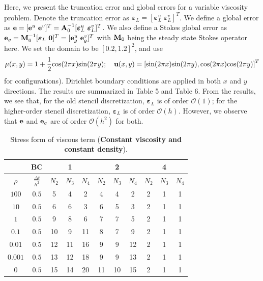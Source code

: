 \documentclass[9pt]{article}
\newcommand{\V}[1]{\boldsymbol{#1}}
\begin{document}
Here, we present the truncation error and global errors for a variable viscosity problem. Denote the truncation error as ${\V{\varepsilon}}_L=[{\V{\varepsilon}}_L^u ~{\V{\varepsilon}}_L^v]^T$. We define a global error as ${\bf e}=[{\bf e}^u ~{\bf e}^v]^T={\bf A}_0^{-1}[{\V{\varepsilon}}_L^u ~{\V{\varepsilon}}_L^v]^T$. We also define a Stokes global error as ${\bf e}_g={\bf M}_0^{-1}[{\V{\varepsilon}}_L ~{\bf 0}]^{T}=[{\bf e}_g^u ~{\bf e}_g^v]^T$ with ${\bf M}_0$ being the steady state Stokes operator here. We set the domain to be $[0.2, 1.2]^2$, and use
$$
\mu(x,y)=1+\frac{1}{2} \mbox{cos}(2 \pi x) \mbox{sin}(2 \pi y); \quad
{\bf u}(x, y)=\left[ \mbox{sin}(2 \pi x) \mbox{sin} (2 \pi y), \mbox{cos} (2 \pi x)\mbox{cos}(2 \pi y) \right]^{T}
$$
for configurations). Dirichlet boundary conditions are applied in both $x$ and $y$ directions. The results are summarized in Table 5 and Table 6. From the results, we see that, for the old stencil discretization, ${\V{\varepsilon}}_L$ is of order $\mathcal{O}(1)$; for the higher-order stencil discretization, ${\V{\varepsilon}}_L$ is of order  $\mathcal{O}(h)$. However, we observe that ${\bf e}$ and ${\bf e}_g$ are of order $\mathcal{O}(h^2)$ for both.
\begin{table}[h]
\begin{center}
\begin{tabular}{|c|c||ccc|ccc|ccc|}
\hline
$ $   &BC     &     &1   &    &    &2    &     &   &4     & \\
\hline
$\rho$  &$\frac{\Delta t}{h^2}$   &$N_2$ &$N_3$ &$N_4$   &$N_2$ &$N_3$ &$N_4$   &$N_2$ & $N_3$ &$N_4$  \\
\hline
\hline
$100$   &$0.5$   &5  &4  &2     &4  &4  &2     &2   &1  &1 \\
\hline
$10$    &$0.5$   &6  &6  &3     &6  &5  &3     &2   &1  &1\\
\hline
$1$     &$0.5$   &9  &8  &6     &7  &7  &5     &2   &1  &1\\
\hline
$0.1$   &$0.5$   &10 &9  &11    &8  &7  &9     &2   &1  &1\\
\hline
$0.01$  &$0.5$   &12 &11 &16    &9  &9  &12    &2   &1  &1\\
\hline
$0.001$ &$0.5$   &13 &12 &18    &9  &9  &13    &2   &1  &1\\
\hline
$0$     &$0.5$   &15 &14 &20   &11  &10 &15    &2   &1  &1\\
\hline
\end{tabular}
\vspace{2mm} \caption{Stress form of viscous term ({\bf Constant viscosity and constant density}).
}
\end{center}
\end{table}
\end{document}

